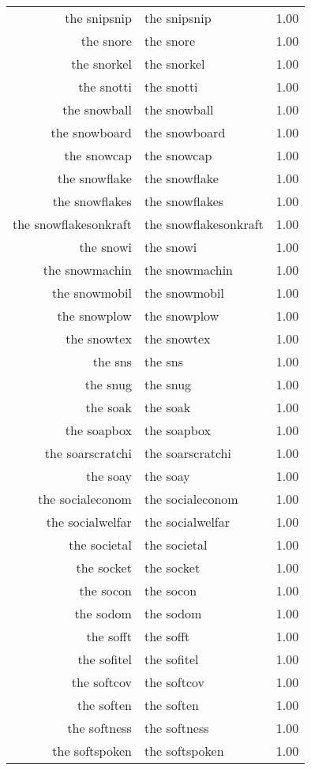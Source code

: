 \begin{table}[ht]
\begin{tabular}{rlr}
  the snipsnip & the snipsnip & 1.00 \\ 
  the snore & the snore & 1.00 \\ 
  the snorkel & the snorkel & 1.00 \\ 
  the snotti & the snotti & 1.00 \\ 
  the snowball & the snowball & 1.00 \\ 
  the snowboard & the snowboard & 1.00 \\ 
  the snowcap & the snowcap & 1.00 \\ 
  the snowflake & the snowflake & 1.00 \\ 
  the snowflakes & the snowflakes & 1.00 \\ 
  the snowflakesonkraft & the snowflakesonkraft & 1.00 \\ 
  the snowi & the snowi & 1.00 \\ 
  the snowmachin & the snowmachin & 1.00 \\ 
  the snowmobil & the snowmobil & 1.00 \\ 
  the snowplow & the snowplow & 1.00 \\ 
  the snowtex & the snowtex & 1.00 \\ 
  the sns & the sns & 1.00 \\ 
  the snug & the snug & 1.00 \\ 
  the soak & the soak & 1.00 \\ 
  the soapbox & the soapbox & 1.00 \\ 
  the soarscratchi & the soarscratchi & 1.00 \\ 
  the soay & the soay & 1.00 \\ 
  the socialeconom & the socialeconom & 1.00 \\ 
  the socialwelfar & the socialwelfar & 1.00 \\ 
  the societal & the societal & 1.00 \\ 
  the socket & the socket & 1.00 \\ 
  the socon & the socon & 1.00 \\ 
  the sodom & the sodom & 1.00 \\ 
  the sofft & the sofft & 1.00 \\ 
  the sofitel & the sofitel & 1.00 \\ 
  the softcov & the softcov & 1.00 \\ 
  the soften & the soften & 1.00 \\ 
  the softness & the softness & 1.00 \\ 
  the softspoken & the softspoken & 1.00 \\ 

\end{tabular}
\end{table}
